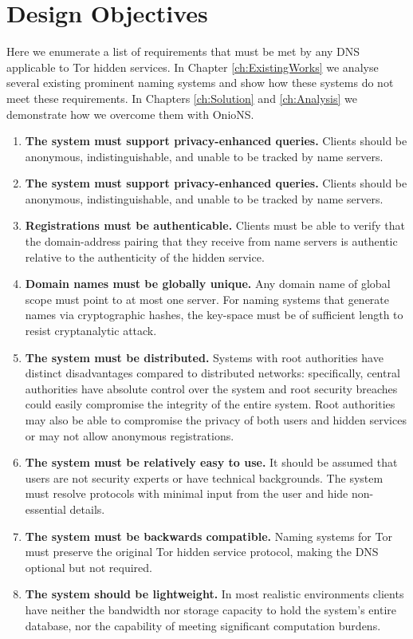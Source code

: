 \section{Design Objectives}
\label{sec:Objectives}

Here we enumerate a list of requirements that must be met by any DNS applicable to Tor hidden services. In Chapter \ref{ch:ExistingWorks} we analyse several existing prominent naming systems and show how these systems do not meet these requirements. In Chapters \ref{ch:Solution} and \ref{ch:Analysis} we demonstrate how we overcome them with OnioNS.

\begin{enumerate}
	\item \textbf{The system must support privacy-enhanced queries.} Clients should be anonymous, indistinguishable, and unable to be tracked by name servers.
	\item \textbf{The system must support privacy-enhanced queries.} Clients should be anonymous, indistinguishable, and unable to be tracked by name servers.
	\item \textbf{Registrations must be authenticable.} Clients must be able to verify that the domain-address pairing that they receive from name servers is authentic relative to the authenticity of the hidden service. %
	\item \textbf{Domain names must be globally unique.} Any domain name of global scope must point to at most one server. For naming systems that generate names via cryptographic hashes, the key-space must be of sufficient length to resist cryptanalytic attack.
	\item \textbf{The system must be distributed.} Systems with root authorities have distinct disadvantages compared to distributed networks: specifically, central authorities have absolute control over the system and root security breaches could easily compromise the integrity of the entire system. Root authorities may also be able to compromise the privacy of both users and hidden services or may not allow anonymous registrations.
	\item \textbf{The system must be relatively easy to use.} It should be assumed that users are not security experts or have technical backgrounds. The system must resolve protocols with minimal input from the user and hide non-essential details.
	\item \textbf{The system must be backwards compatible.} Naming systems for Tor must preserve the original Tor hidden service protocol, making the DNS optional but not required.
	\item \textbf{The system should be lightweight.} In most realistic environments clients have neither the bandwidth nor storage capacity to hold the system's entire database, nor the capability of meeting significant computation burdens.
\end{enumerate}

